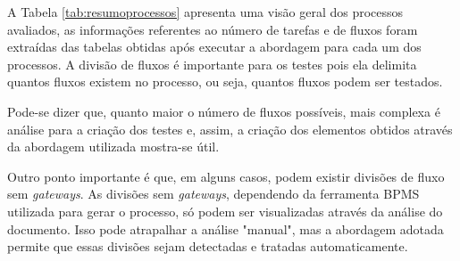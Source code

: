 \documentclass[12pt]{article}
\begin{document}
A Tabela \ref{tab:resumoprocessos} apresenta uma visão geral dos processos avaliados, as informações referentes ao número de tarefas e de fluxos foram extraídas das tabelas obtidas após executar a abordagem para cada um dos processos. A divisão de fluxos é importante para os testes pois ela delimita quantos fluxos existem no processo, ou seja, quantos fluxos podem ser testados.
 
\begin{table}[]
\centering
\caption{Resumo dos processos avaliados}
\label{tab:resumoprocessos}
\end{table}


 Pode-se dizer que, quanto maior o número de fluxos possíveis, mais complexa é análise para a criação dos testes e, assim, a criação dos elementos obtidos através da abordagem utilizada mostra-se útil.
 
 Outro ponto importante é que, em alguns casos, podem existir divisões de fluxo sem \emph{gateways}. As divisões sem \emph{gateways}, dependendo da ferramenta BPMS utilizada para gerar o processo, só podem ser visualizadas através da análise do documento. Isso pode atrapalhar a análise "manual", mas a abordagem adotada permite que essas divisões sejam detectadas e tratadas automaticamente.
\end{document}
